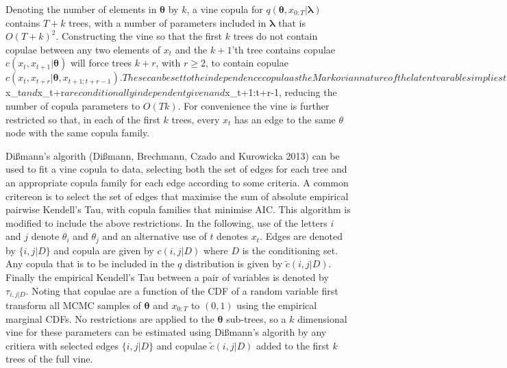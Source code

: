 \documentclass[12pt,a4paper]{article}%
\numberwithin{equation}{section}
\begin{document}
Denoting the number of elements in $\boldsymbol{\theta}$ by $k$, a vine copula for $q(\boldsymbol{\theta}, x_{0:T} | \boldsymbol{\lambda})$ contains $T+k$ trees, with a number of parameters included in $\boldsymbol{\lambda}$ that is $O(T+k)^2$. Constructing the vine so that the first $k$ trees do not contain copulae between any two elements of $x_t$ and the $k+1$'th tree contains copulae $c(x_t, x_{t+1} | \boldsymbol{\theta})$ will force trees $k+r$, with $r \geq 2$, to contain copulae $c(x_t, x_{t+r} | \boldsymbol{\theta}, x_{t+1:t+r-1}). These can be set to the independence copula as the Markovian nature of the latent varables implies that $x_t$ and $x_{t+r}$ are conditionally independent given $\boldsymbol{\theta}$ and $x_{t+1:t+r-1}, reducing the number of copula parameters to $O(Tk)$. For convenience the vine is further restricted so that, in each of the first $k$ trees, every $x_t$ has an edge to the same $\theta$ node with the same copula family. 

Di{\ss}mann's algorith (Di{\ss}mann, Brechmann, Czado and Kurowicka 2013) can be used to fit a vine copula to data, selecting both the set of edges for each tree and an appropriate copula family for each edge according to some criteria. A common critereon is to select the set of edges that maximise the sum of absolute empirical pairwise Kendell's Tau, with copula families that minimise AIC. This algorithm is modified to include the above restrictions. In the following, use of the letters $i$ and $j$ denote $\theta_i$ and $\theta_j$ and an alternative use of $t$ denotes $x_t$. Edges are denoted by $\{i, j | D \}$ and copula are given by $c(i, j | D)$ where $D$ is the conditioning set. Any copula that is to be included in the $q$ distribution is given by $\tilde{c}(i, j | D)$. Finally the empirical Kendell's Tau between a pair of variables is denoted by $\tau_{i, j | D}$. Noting that copulae are a function of the CDF of a random variable first transform all MCMC samples of $\boldsymbol{\theta}$ and $x_{0:T}$ to $(0, 1)$ using the empirical marginal CDFs. No restrictions are applied to the $\boldsymbol{\theta}$ sub-trees, so a $k$ dimensional vine for these parameters can be estimated using Di{\ss}mann's algorith by any critiera with selected edges $\{i, j | D\}$ and copulae $\tilde{c}(i, j | D)$ added to the first $k$ trees of the full vine. 
\end{document}
